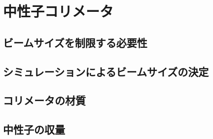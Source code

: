 \documentclass[../master]{subfiles}
\begin{document}
\chapter{中性子コリメータ}
\section{ビームサイズを制限する必要性}
\section{シミュレーションによるビームサイズの決定}
\section{コリメータの材質}
\section{中性子の収量}
\end{document}
